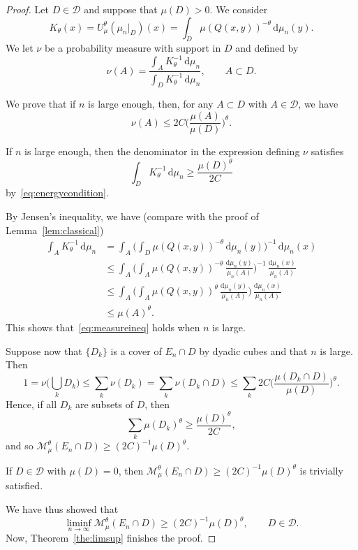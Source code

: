 \documentclass[AHL,Unicode,longabstracts]{cedram}
\newcommand*{\dd}{\mathrm{d}}
\begin{document}
\begin{proof}
Let $D \in \mathscr{D}$ and suppose that $\mu (D) > 0$. We consider
\[
K_\theta (x) = U_\mu^\theta (\mu_n|_D) (x) = \int_D \mu (Q(x,y))^{-\theta} \, \dd \mu_n (y).
\]
We let $\nu$ be a probability measure with support in $D$ and defined by
\[
\nu (A) = \frac{\int_A K_\theta^{-1} \, \dd \mu_n}{\int_D K_\theta^{-1} \, \dd \mu_n}, \qquad A \subset D.
\]

We prove that if $n$ is large enough, then, for any $A \subset D$ with $A \in \mathscr{D}$, we have
\begin{equation}\label{eq:measureineq}
\nu (A) \leq 2 C \biggl(\frac{\mu (A)}{\mu (D)} \biggr)^\theta.
\end{equation}

If $n$ is large enough, then the denominator in the expression defining $\nu$ satisfies
\[
\int_D K_\theta^{-1} \, \dd \mu_n \geq
\frac{\mu(D)^\theta}{2C}
\]
by~\eqref{eq:energycondition}.

By Jensen's inequality, we have (compare with the proof of Lemma~\ref{lem:classical})
\begin{align*}
\int_A K_\theta^{-1} \, \dd \mu_n & = \int_A \biggl(\int_D
\mu (Q(x,y))^{-\theta} \, \dd \mu_n (y) \biggr)^{-1} \,
\dd \mu_n (x) \\ &\leq \int_A \biggl(\int_A \mu (Q(x,y))^{-\theta} \, \frac{\dd \mu_n (y)}{\mu_n (A)}
\biggr)^{-1} \, \frac{\dd \mu_n (x)}{\mu_n (A)} \\ &\leq
\int_A \biggl(\int_A \mu (Q(x,y))^{\theta} \, \frac{\dd
\mu_n (y)}{\mu_n (A)} \biggr) \, \frac{\dd \mu_n (x)}{\mu_n (A)} \\ &\leq \mu (A)^\theta.
\end{align*}
This shows that~\eqref{eq:measureineq} holds when $n$ is large.

Suppose now that $\{D_k\}$ is a cover of $E_n \cap D$ by dyadic cubes and that $n$ is large. Then
\[
1 = \nu \biggl(\bigcup_k D_k \biggr) \leq \sum_k \nu (D_k) = \sum_k
\nu (D_k \cap D) \leq \sum_k 2 C \biggl(\frac{\mu (D_k \cap D)}{\mu (D)} \biggr)^\theta.
\]
Hence, if all $D_k$ are subsets of $D$, then
\[
\sum_k \mu(D_k)^\theta \geq \frac{\mu (D)^\theta}{2 C},
\]
and so $\mathscr{M}_\mu^\theta (E_n \cap D) \geq (2C)^{-1} \mu (D)^\theta$.

If $D \in \mathscr{D}$ with $\mu (D) = 0$, then $\mathscr{M}_\mu^\theta (E_n \cap D) \geq (2C)^{-1} \mu (D)^\theta$ is trivially satisfied.

We have thus showed that
\[
\liminf_{n \to \infty} \mathscr{M}_\mu^\theta (E_n \cap D) \geq (2C)^{-1} \mu (D)^\theta, \qquad D \in \mathscr{D}.
\]
Now, Theorem~\ref{the:limsup} finishes the proof.
\end{proof}
\end{document}
